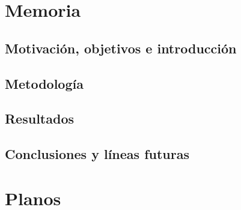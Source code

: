 \documentclass[12pt,a4paper,titlepage,twoside]{book}
\newcommand{\blankpage}{
\newpage \thispagestyle{empty}
\emph{  }
\newpage
}
\begin{document}
\mainmatter
	
\part{Memoria}
\chapter{Motivación, objetivos e introducción}
		
\label{cap:intro}
\chapter{Metodología}
	
\label{cap:metodologia}
\chapter{Resultados}
	
\label{cap:resultados}
\chapter{Conclusiones y líneas futuras}
	
\label{cap:conclusiones}




\part{Planos}
\label{parte:planos}
\blankpage \blankpage %
\blankpage \blankpage %
\blankpage \blankpage %
\blankpage \blankpage %
\blankpage \blankpage %





\end{document}
